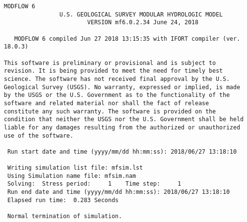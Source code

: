 {\small
\begin{lstlisting}[style=modeloutput]
                                   MODFLOW 6
                U.S. GEOLOGICAL SURVEY MODULAR HYDROLOGIC MODEL
                        VERSION mf6.0.2.34 June 24, 2018

   MODFLOW 6 compiled Jun 27 2018 13:15:35 with IFORT compiler (ver. 18.0.3)

This software is preliminary or provisional and is subject to
revision. It is being provided to meet the need for timely best
science. The software has not received final approval by the U.S.
Geological Survey (USGS). No warranty, expressed or implied, is made
by the USGS or the U.S. Government as to the functionality of the
software and related material nor shall the fact of release
constitute any such warranty. The software is provided on the
condition that neither the USGS nor the U.S. Government shall be held
liable for any damages resulting from the authorized or unauthorized
use of the software.

 Run start date and time (yyyy/mm/dd hh:mm:ss): 2018/06/27 13:18:10

 Writing simulation list file: mfsim.lst
 Using Simulation name file: mfsim.nam
 Solving:  Stress period:     1    Time step:     1
 Run end date and time (yyyy/mm/dd hh:mm:ss): 2018/06/27 13:18:10
 Elapsed run time:  0.283 Seconds

 Normal termination of simulation.

\end{lstlisting}
}
